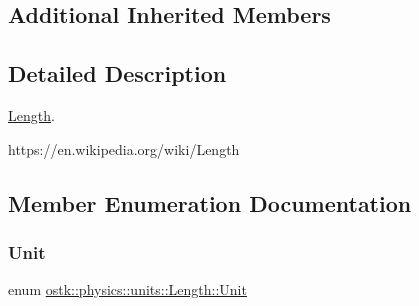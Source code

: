 \subsection*{Additional Inherited Members}


\subsection{Detailed Description}
\hyperlink{classostk_1_1physics_1_1units_1_1_length}{Length}. 

https\+://en.wikipedia.\+org/wiki/\+Length 

\subsection{Member Enumeration Documentation}
\mbox{\label{classostk_1_1physics_1_1units_1_1_length_a2664470a7eedf5d45c88861fe69badea}} 
\subsubsection{\texorpdfstring{Unit}{Unit}}
{\footnotesize\ttfamily enum \hyperlink{classostk_1_1physics_1_1units_1_1_length_a2664470a7eedf5d45c88861fe69badea}{ostk\+::physics\+::units\+::\+Length\+::\+Unit}\hspace{0.3cm}{\ttfamily [strong]}}

